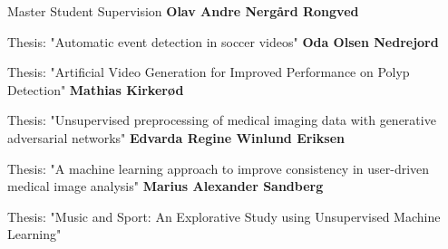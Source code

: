 \begin{rubric}{Master Student Supervision}
    \entry*[2020]%
    \textbf{Olav Andre Nergård Rongved} \par
    Thesis: "Automatic event detection in soccer videos"
    \entry*[2020]%
    \textbf{Oda Olsen Nedrejord} \par
    Thesis: "Artificial Video Generation for Improved Performance on Polyp Detection"
    \entry*[2019]%
    \textbf{Mathias Kirkerød} \par
    Thesis: "Unsupervised preprocessing of medical imaging data with generative adversarial networks"
    \entry*[2019]%
    \textbf{Edvarda Regine Winlund Eriksen} \par
    Thesis: "A machine learning approach to improve consistency in user-driven medical image analysis"
    \entry*[2019]%
    \textbf{Marius Alexander Sandberg} \par
    Thesis: "Music and Sport: An Explorative Study using Unsupervised Machine Learning"
\end{rubric}